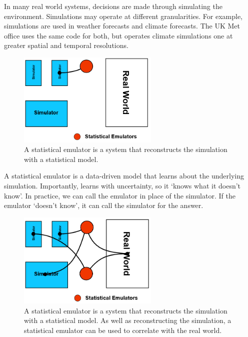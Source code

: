 \documentclass[a4paper]{caesar_book}
\begin{document}
In many real world systems, decisions are made through simulating the environment. Simulations may operate at different granularities. For example, simulations are used in weather forecasts and climate forecasts. The UK Met office uses the same code for both, but operates climate simulations one at greater spatial and temporal resolutions.

\begin{figure}%
	\includegraphics[width=0.6\textwidth,keepaspectratio]{pictures/sim_2.PNG}%
	\caption*{A statistical emulator is a system that reconstructs the simulation with a statistical model.}%
\end{figure}%

A statistical emulator is a data-driven model that learns about the underlying simulation. Importantly, learns with uncertainty, so it ‘knows what it doesn't know’. In practice, we can call the emulator in place of the simulator. If the emulator ‘doesn't know’, it can call the simulator for the answer.

\begin{figure}%
	\includegraphics[width=0.6\textwidth,keepaspectratio]{pictures/sim_3.PNG}%
	\caption*{A statistical emulator is a system that reconstructs the simulation with a statistical model. As well as reconstructing the simulation, a statistical emulator can be used to correlate with the real world.}%
\end{figure}%
\end{document}
